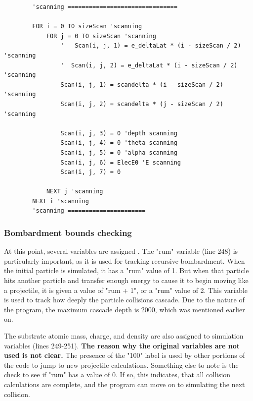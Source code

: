 \documentclass[10pt, reqno]{exam}
\begin{document}
\begin{verbatim}
        'scanning ===============================
    
        FOR i = 0 TO sizeScan 'scanning
            FOR j = 0 TO sizeScan 'scanning
                '   Scan(i, j, 1) = e_deltaLat * (i - sizeScan / 2) 'scanning
                '  Scan(i, j, 2) = e_deltaLat * (i - sizeScan / 2) 'scanning
                Scan(i, j, 1) = scandelta * (i - sizeScan / 2) 'scanning
                Scan(i, j, 2) = scandelta * (j - sizeScan / 2) 'scanning
    
                Scan(i, j, 3) = 0 'depth scanning
                Scan(i, j, 4) = 0 'theta scanning
                Scan(i, j, 5) = 0 'alpha scanning
                Scan(i, j, 6) = ElecE0 'E scanning
                Scan(i, j, 7) = 0
    
            NEXT j 'scanning
        NEXT i 'scanning
        'scanning ======================
\end{verbatim}
\subsubsection{Bombardment bounds checking}
\label{sec:bounds checking}

At this point, several variables are assigned . The "rum" variable (line 248) is particularly important, as it is used for tracking recursive bombardment. When the initial particle is simulated, it has a "rum" value of 1. But when that particle hits another particle and transfer enough energy to cause it to begin moving like a projectile, it is given a value of "rum + 1", or a "rum" value of 2. This variable is used to track how deeply the particle collisions cascade. Due to the nature of the program, the maximum cascade depth is 2000, which was mentioned earlier on. \par

The substrate atomic mass, charge, and density are also assigned to simulation variables (lines 249-251). \textbf{The reason why the original variables are not used is not clear.} The presence of the "100" label is used by other portions of the code to jump to new projectile calculations. Something else to note is the check to see if "rum" has a value of 0. If so, this indicates, that all collision calculations are complete, and the program can move on to simulating the next collision. \par
\end{document}

